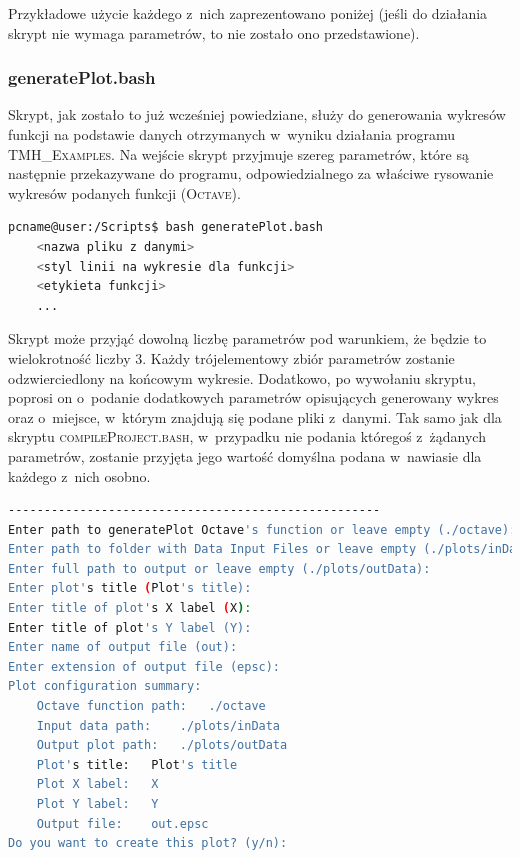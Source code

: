 
Przykładowe użycie każdego z~nich zaprezentowano poniżej (jeśli do działania skrypt nie wymaga parametrów, to nie zostało ono przedstawione).

\subsubsection{generatePlot.bash}

Skrypt, jak zostało to już wcześniej powiedziane, służy do generowania wykresów funkcji na podstawie danych otrzymanych w~wyniku działania programu \textsc{TMH\_Examples}.
Na wejście skrypt przyjmuje szereg parametrów, które są następnie przekazywane do programu, odpowiedzialnego za właściwe rysowanie wykresów podanych funkcji (\textsc{Octave}).

\begin{lstlisting}[language=bash]
pcname@user:/Scripts$ bash generatePlot.bash 
	<nazwa pliku z danymi>
	<styl linii na wykresie dla funkcji>
	<etykieta funkcji>
	...
\end{lstlisting}

Skrypt może przyjąć dowolną liczbę parametrów pod warunkiem, że będzie to wielokrotność liczby $3$.
Każdy trójelementowy zbiór parametrów zostanie odzwierciedlony na końcowym wykresie.
Dodatkowo, po wywołaniu skryptu, poprosi on o~podanie dodatkowych parametrów opisujących generowany wykres oraz o~miejsce, w~którym znajdują się podane pliki z~danymi.
Tak samo jak dla skryptu \textsc{compileProject.bash}, w~przypadku nie podania któregoś z~żądanych parametrów, zostanie przyjęta jego wartość domyślna podana w~nawiasie dla każdego z~nich osobno.

\small
\begin{lstlisting}[language=bash]
----------------------------------------------------
Enter path to generatePlot Octave's function or leave empty (./octave):
Enter path to folder with Data Input Files or leave empty (./plots/inData):
Enter full path to output or leave empty (./plots/outData):
Enter plot's title (Plot's title):
Enter title of plot's X label (X):
Enter title of plot's Y label (Y):
Enter name of output file (out):
Enter extension of output file (epsc):
Plot configuration summary: 
	Octave function path:	./octave
	Input data path:	./plots/inData
	Output plot path:	./plots/outData
	Plot's title:	Plot's title
	Plot X label:	X
	Plot Y label:	Y
	Output file:	out.epsc
Do you want to create this plot? (y/n):
\end{lstlisting}
\normalsize


